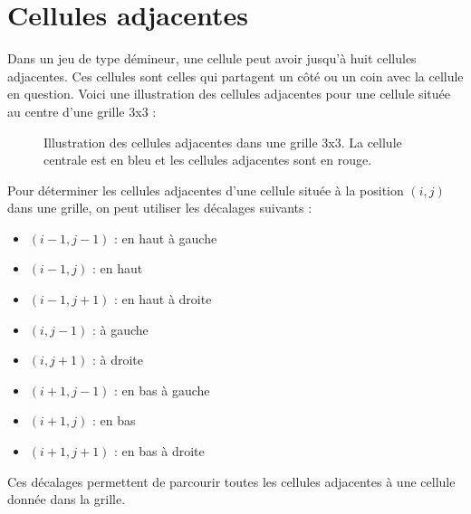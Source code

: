 \section{Cellules adjacentes}
\label{sec:cellules-adjacentes}

Dans un jeu de type démineur, une cellule peut avoir jusqu'à huit cellules adjacentes. Ces cellules sont celles qui partagent un côté ou un coin avec la cellule en question. Voici une illustration des cellules adjacentes pour une cellule située au centre d'une grille 3x3 :

\begin{figure}[!htpb]
    \centering
    \caption{Illustration des cellules adjacentes dans une grille 3x3. La cellule centrale est en bleu et les cellules adjacentes sont en rouge.}
    \label{fig:cellules-adjacentes}
\end{figure}

Pour déterminer les cellules adjacentes d'une cellule située à la position $(i, j)$ dans une grille, on peut utiliser les décalages suivants :

\begin{itemize}
    \item $(i-1, j-1)$ : en haut à gauche
    \item $(i-1, j)$ : en haut
    \item $(i-1, j+1)$ : en haut à droite
    \item $(i, j-1)$ : à gauche
    \item $(i, j+1)$ : à droite
    \item $(i+1, j-1)$ : en bas à gauche
    \item $(i+1, j)$ : en bas
    \item $(i+1, j+1)$ : en bas à droite
\end{itemize}

Ces décalages permettent de parcourir toutes les cellules adjacentes à une cellule donnée dans la grille.
